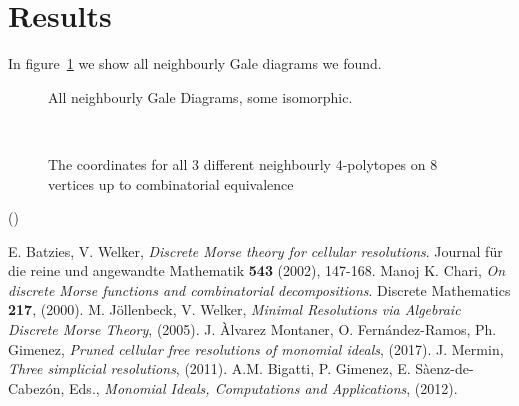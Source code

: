 \documentclass[paper=a4, fontsize=11pt]{scrartcl} %
\theoremstyle{plain}
\theoremstyle{definition}
\begin{document}
\section{Results}
In figure~\ref{fig:gale} we show all neighbourly Gale diagrams we found.
\begin{figure}[!htb]
\centering
\caption{All neighbourly Gale Diagrams, some isomorphic.}
\label{fig:gale}
\end{figure}\\

\begin{figure}[!htb]
%
\caption{The coordinates for all $3$ different neighbourly $4$-polytopes on $8$ vertices up to combinatorial equivalence}
\label{fig:polyPoints}
\end{figure}

(\cite{BaWe02})

\begin{thebibliography}{9}
E. Batzies, V. Welker, \textit{Discrete Morse theory for cellular resolutions}. Journal f{\"u}r die reine und angewandte Mathematik \textbf{543} (2002), 147-168.
Manoj K. Chari, \textit{On discrete Morse functions and combinatorial decompositions}. Discrete Mathematics \textbf{217}, (2000).
M. J{\"o}llenbeck, V. Welker, \textit{Minimal Resolutions via Algebraic Discrete Morse Theory}, (2005).
J. \`Alvarez Montaner, O. Fern\'andez-Ramos, Ph. Gimenez, \textit{Pruned cellular free resolutions of monomial ideals}, (2017).
J. Mermin, \textit{Three simplicial resolutions}, (2011).
A.M. Bigatti, P. Gimenez, E. S\`aenz-de-Cabez\'on, Eds., \textit{Monomial Ideals, Computations and Applications}, (2012).
\end{thebibliography}
\end{document}
